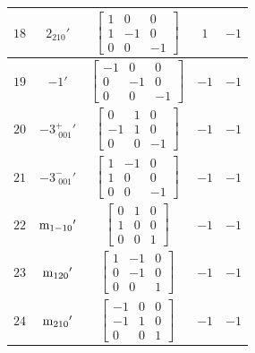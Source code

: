 \documentclass[fleqn,8pt]{jsarticle}
\begin{document}
\begin{longtable}{ccccc}
$ 18 $ & $ 2{}_{210}{}' $ & $ \begin{bmatrix} 1 & 0 & 0 \\ 1 & -1 & 0 \\ 0 & 0 & -1 \end{bmatrix} $ & $ 1 $ & $ -1 $ \\ \hline
$ 19 $ & $ -1{}' $ & $ \begin{bmatrix} -1 & 0 & 0 \\ 0 & -1 & 0 \\ 0 & 0 & -1 \end{bmatrix} $ & $ -1 $ & $ -1 $ \\ \hline
$ 20 $ & $ -3^{+}_{\,\,001}{}' $ & $ \begin{bmatrix} 0 & 1 & 0 \\ -1 & 1 & 0 \\ 0 & 0 & -1 \end{bmatrix} $ & $ -1 $ & $ -1 $ \\ \hline
$ 21 $ & $ -3^{-}_{\,\,001}{}' $ & $ \begin{bmatrix} 1 & -1 & 0 \\ 1 & 0 & 0 \\ 0 & 0 & -1 \end{bmatrix} $ & $ -1 $ & $ -1 $ \\ \hline
$ 22 $ & $ {\rm m}_{1-10}{}' $ & $ \begin{bmatrix} 0 & 1 & 0 \\ 1 & 0 & 0 \\ 0 & 0 & 1 \end{bmatrix} $ & $ -1 $ & $ -1 $ \\ \hline
$ 23 $ & $ {\rm m}_{120}{}' $ & $ \begin{bmatrix} 1 & -1 & 0 \\ 0 & -1 & 0 \\ 0 & 0 & 1 \end{bmatrix} $ & $ -1 $ & $ -1 $ \\ \hline
$ 24 $ & $ {\rm m}_{210}{}' $ & $ \begin{bmatrix} -1 & 0 & 0 \\ -1 & 1 & 0 \\ 0 & 0 & 1 \end{bmatrix} $ & $ -1 $ & $ -1 $ \\
\end{longtable}
\end{document}
